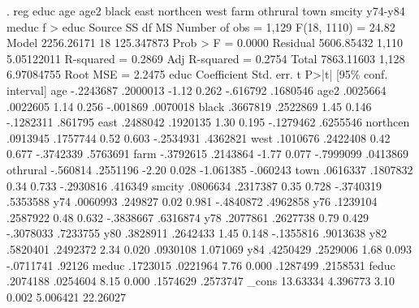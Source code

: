 . reg educ age age2 black east northcen west farm othrural town smcity y74-y84 meduc f
> educ
{\smallskip}
      Source {\VBAR}       SS           df       MS      Number of obs   =     1,129
   F(18, 1110)     =     24.82
       Model {\VBAR}  2256.26171        18  125.347873   Prob > F        =    0.0000
    Residual {\VBAR}  5606.85432     1,110  5.05122011   R-squared       =    0.2869
   Adj R-squared   =    0.2754
       Total {\VBAR}  7863.11603     1,128  6.97084755   Root MSE        =    2.2475
{\smallskip}
        educ {\VBAR} Coefficient  Std. err.      t    P>|t|     [95\% conf. interval]
         age {\VBAR}  -.2243687   .2000013    -1.12   0.262     -.616792    .1680546
        age2 {\VBAR}   .0025664   .0022605     1.14   0.256     -.001869    .0070018
       black {\VBAR}   .3667819   .2522869     1.45   0.146    -.1282311     .861795
        east {\VBAR}   .2488042   .1920135     1.30   0.195    -.1279462    .6255546
    northcen {\VBAR}   .0913945   .1757744     0.52   0.603    -.2534931    .4362821
        west {\VBAR}   .1010676   .2422408     0.42   0.677    -.3742339    .5763691
        farm {\VBAR}  -.3792615   .2143864    -1.77   0.077    -.7999099    .0413869
    othrural {\VBAR}   -.560814   .2551196    -2.20   0.028    -1.061385    -.060243
        town {\VBAR}   .0616337   .1807832     0.34   0.733    -.2930816     .416349
      smcity {\VBAR}   .0806634   .2317387     0.35   0.728    -.3740319    .5353588
         y74 {\VBAR}   .0060993    .249827     0.02   0.981    -.4840872    .4962858
         y76 {\VBAR}   .1239104   .2587922     0.48   0.632    -.3838667    .6316874
         y78 {\VBAR}   .2077861   .2627738     0.79   0.429    -.3078033    .7233755
         y80 {\VBAR}   .3828911   .2642433     1.45   0.148    -.1355816    .9013638
         y82 {\VBAR}   .5820401   .2492372     2.34   0.020     .0930108    1.071069
         y84 {\VBAR}   .4250429   .2529006     1.68   0.093    -.0711741      .92126
       meduc {\VBAR}   .1723015   .0221964     7.76   0.000     .1287499    .2158531
       feduc {\VBAR}   .2074188   .0254604     8.15   0.000     .1574629    .2573747
       _cons {\VBAR}   13.63334   4.396773     3.10   0.002     5.006421    22.26027
{\smallskip}
